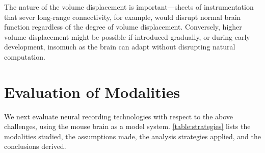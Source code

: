 The nature of the volume displacement is important---sheets of instrumentation that sever long-range connectivity, for example, would disrupt normal brain function regardless of the degree of volume displacement.
Conversely, higher volume displacement might be possible if introduced gradually, or during early development, insomuch as the brain can adapt without disrupting natural computation.

\section{Evaluation of Modalities}

We next evaluate neural recording technologies with respect to the above challenges, using the mouse brain as a model system.
\autoref{table:strategies} lists the modalities studied, the assumptions made, the analysis strategies applied, and the conclusions derived.

